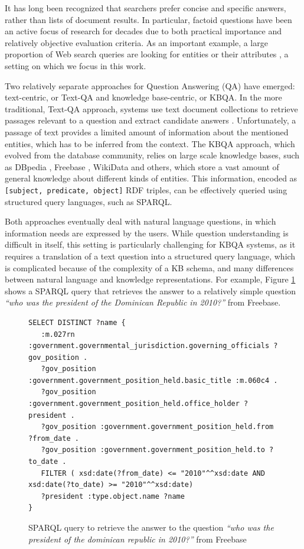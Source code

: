 It has long been recognized that searchers prefer concise and specific answers, rather than lists of document results.
In particular, factoid questions have been an active focus of research for decades due to both practical importance and relatively objective evaluation criteria.
As an important example, a large proportion of Web search queries are looking for entities or their attributes \cite{Pound:2010:AOR:1772690.1772769}, a setting on which we focus in this work. 

Two relatively separate approaches for Question Answering (QA) have emerged: text-centric, or Text-QA and knowledge base-centric, or KBQA.
In the more traditional, Text-QA approach, systems use text document collections to retrieve passages relevant to a question and extract candidate answers \cite{dang2007overview}.
Unfortunately, a passage of text provides a limited amount of information about the mentioned entities, which has to be inferred from the context.
The KBQA approach, which evolved from the database community, relies on large scale knowledge bases, such as DBpedia \cite{auer2007dbpedia}, Freebase \cite{Bollacker:2008:FCC:1376616.1376746}, WikiData \cite{Vrandecic:2014:WFC:2661061.2629489} and others, which store a vast amount of general knowledge about different kinds of entities.
This information, encoded as \texttt{[subject, predicate, object]} RDF triples, can be effectively queried using structured query languages, such as SPARQL.

Both approaches eventually deal with natural language questions, in which information needs are expressed by the users.
While question understanding is difficult in itself, this setting is particularly challenging for KBQA systems, as it requires a translation of a text question into a structured query language, which is complicated because of the complexity of a KB schema, and many differences between natural language and knowledge representations. 
For example, Figure \ref{fig:example_sparql} shows a SPARQL query that retrieves the answer to a relatively simple question \textit{``who was the president of the Dominican Republic in 2010?''} from Freebase.

\begin{figure}
\centering
\begin{lstlisting}[frame=single,basicstyle=\small]
SELECT DISTINCT ?name {
   :m.027rn :government.governmental_jurisdiction.governing_officials ?gov_position .
   ?gov_position :government.government_position_held.basic_title :m.060c4 .
   ?gov_position :government.government_position_held.office_holder ?president .
   ?gov_position :government.government_position_held.from ?from_date .
   ?gov_position :government.government_position_held.to ?to_date .
   FILTER ( xsd:date(?from_date) <= "2010"^^xsd:date AND xsd:date(?to_date) >= "2010"^^xsd:date)
   ?president :type.object.name ?name
}
\end{lstlisting}
\vspace{-4mm}
\caption{SPARQL query to retrieve the answer to the question \textit{``who was the president of the dominican republic in 2010?''} from Freebase}
\label{fig:example_sparql}
\end{figure}

